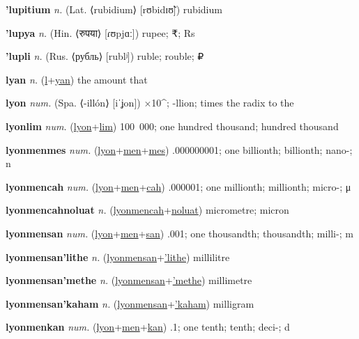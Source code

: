 \textbf{\hypertarget{'lupitium}{'lupitium}} \textit{n.} (Lat. ⟨rubidium⟩ [rʊbidɪʊ̃])
rubidium

\textbf{\hypertarget{'lupya}{'lupya}} \textit{n.} (Hin. ⟨{\devanagari{}रुपया}⟩ [ɾʊpjɑː])
rupee; ₹; Rs

\textbf{\hypertarget{'lupli}{'lupli}} \textit{n.} (Rus. ⟨рубль⟩ [rublʲ])
ruble; rouble; ₽

\textbf{\hypertarget{lyan}{lyan}} \textit{n.} (\hyperlink{l}{l}+\allowbreak \hyperlink{yan}{yan})
the amount that

\textbf{\hypertarget{lyon}{lyon}} \textit{num.} (Spa. ⟨-illón⟩ [iˈʝon])
×10\textasciicircum{}; -llion; times the radix to the

\textbf{\hypertarget{lyonlim}{lyonlim}} \textit{num.} (\hyperlink{lyon}{lyon}+\allowbreak \hyperlink{lim}{lim})
100~000; one hundred thousand; hundred thousand

\textbf{\hypertarget{lyonmenmes}{lyonmenmes}} \textit{num.} (\hyperlink{lyon}{lyon}+\allowbreak \hyperlink{men}{men}+\allowbreak \hyperlink{mes}{mes})
.000000001; one billionth; billionth; nano-; n

\textbf{\hypertarget{lyonmencah}{lyonmencah}} \textit{num.} (\hyperlink{lyon}{lyon}+\allowbreak \hyperlink{men}{men}+\allowbreak \hyperlink{cah}{cah})
.000001; one millionth; millionth; micro-; μ

\textbf{\hypertarget{lyonmencahnoluat}{lyonmencahnoluat}} \textit{n.} (\hyperlink{lyonmencah}{lyonmencah}+\allowbreak \hyperlink{noluat}{noluat})
micrometre; micron

\textbf{\hypertarget{lyonmensan}{lyonmensan}} \textit{num.} (\hyperlink{lyon}{lyon}+\allowbreak \hyperlink{men}{men}+\allowbreak \hyperlink{san}{san})
.001; one thousandth; thousandth; milli-; m

\textbf{\hypertarget{lyonmensan'lithe}{lyonmensan'lithe}} \textit{n.} (\hyperlink{lyonmensan}{lyonmensan}+\allowbreak \hyperlink{'lithe}{'lithe})
millilitre

\textbf{\hypertarget{lyonmensan'methe}{lyonmensan'methe}} \textit{n.} (\hyperlink{lyonmensan}{lyonmensan}+\allowbreak \hyperlink{'methe}{'methe})
millimetre

\textbf{\hypertarget{lyonmensan'kaham}{lyonmensan'kaham}} \textit{n.} (\hyperlink{lyonmensan}{lyonmensan}+\allowbreak \hyperlink{'kaham}{'kaham})
milligram

\textbf{\hypertarget{lyonmenkan}{lyonmenkan}} \textit{num.} (\hyperlink{lyon}{lyon}+\allowbreak \hyperlink{men}{men}+\allowbreak \hyperlink{kan}{kan})
.1; one tenth; tenth; deci-; d

